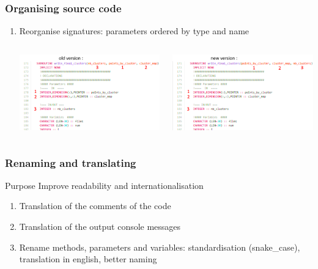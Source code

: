 \documentclass[10p]{beamer}
\begin{document}
\begin{frame}
\begin{enumerate}
\begin{columns}
\begin{column}{150 pt}
\end{column}
\end{columns}
\end{enumerate}
\end{frame}

\begin{frame}
\frametitle{Organising source code}
\begin{enumerate}
\item Reorganise signatures: parameters ordered by type and name
\begin{columns}
\begin{column}{150 pt}
\includegraphics[scale=0.35]{Image/before_reoganize.png}
\end{column}
\begin{column}{150 pt}
\includegraphics[scale=0.35]{Image/after_reorganize.png}
\end{column}
\end{columns}
\end{enumerate}
\end{frame}

\begin{frame}
\frametitle{Renaming and translating}
\begin{block}{Purpose}
Improve readability and internationalisation
\end{block}
\begin{enumerate}
\item Translation of the comments of the code
\item Translation of the output console messages
\item Rename methods, parameters and variables: standardisation (snake\_case), translation in english, better naming
\end{enumerate}
\end{frame}
\end{document}
